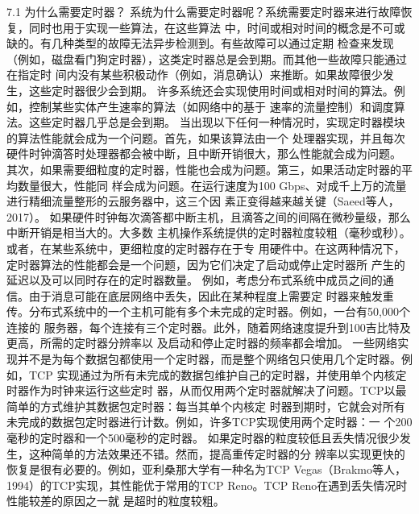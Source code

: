 7.1 为什么需要定时器？
系统为什么需要定时器呢？系统需要定时器来进行故障恢复，同时也用于实现一些算法，在这些算法
中，时间或相对时间的概念是不可或缺的。有几种类型的故障无法异步检测到。有些故障可以通过定期
检查来发现（例如，磁盘看门狗定时器），这类定时器总是会到期。而其他一些故障只能通过在指定时
间内没有某些积极动作（例如，消息确认）来推断。如果故障很少发生，这些定时器很少会到期。
许多系统还会实现使用时间或相对时间的算法。例如，控制某些实体产生速率的算法（如网络中的基于
速率的流量控制）和调度算法。这些定时器几乎总是会到期。
当出现以下任何一种情况时，实现定时器模块的算法性能就会成为一个问题。首先，如果该算法由一个
处理器实现，并且每次硬件时钟滴答时处理器都会被中断，且中断开销很大，那么性能就会成为问题。
其次，如果需要细粒度的定时器，性能也会成为问题。第三，如果活动定时器的平均数量很大，性能同
样会成为问题。在运行速度为100 Gbps、对成千上万的流量进行精细流量整形的云服务器中，这三个因
素正变得越来越关键（Saeed等人，2017）。
如果硬件时钟每次滴答都中断主机，且滴答之间的间隔在微秒量级，那么中断开销是相当大的。大多数
主机操作系统提供的定时器粒度较粗（毫秒或秒）。或者，在某些系统中，更细粒度的定时器存在于专
用硬件中。在这两种情况下，定时器算法的性能都会是一个问题，因为它们决定了启动或停止定时器所
产生的延迟以及可以同时存在的定时器数量。
例如，考虑分布式系统中成员之间的通信。由于消息可能在底层网络中丢失，因此在某种程度上需要定
时器来触发重传。分布式系统中的一个主机可能有多个未完成的定时器。例如，一台有50,000个连接的
服务器，每个连接有三个定时器。此外，随着网络速度提升到100吉比特及更高，所需的定时器分辨率以
及启动和停止定时器的频率都会增加。
一些网络实现并不是为每个数据包都使用一个定时器，而是整个网络包只使用几个定时器。例如，TCP
实现通过为所有未完成的数据包维护自己的定时器，并使用单个内核定时器作为时钟来运行这些定时
器，从而仅用两个定时器就解决了问题。TCP以最简单的方式维护其数据包定时器：每当其单个内核定
时器到期时，它就会对所有未完成的数据包定时器进行计数。例如，许多TCP实现使用两个定时器：一
个200毫秒的定时器和一个500毫秒的定时器。
如果定时器的粒度较低且丢失情况很少发生，这种简单的方法效果还不错。然而，提高重传定时器的分
辨率以实现更快的恢复是很有必要的。例如，亚利桑那大学有一种名为TCP Vegas（Brakmo等人，
1994）的TCP实现，其性能优于常用的TCP Reno。TCP Reno在遇到丢失情况时性能较差的原因之一就
是超时的粒度较粗。

